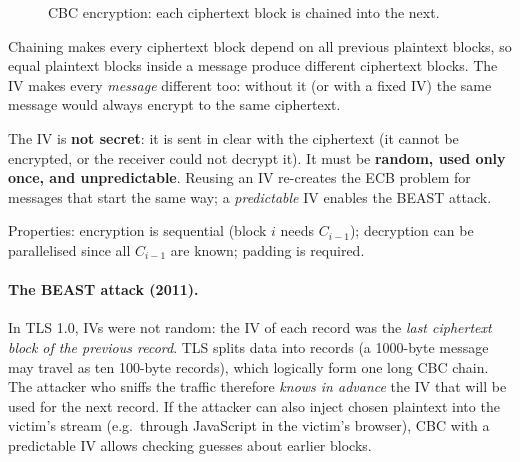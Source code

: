 \begin{figure}[H]
\centering
{}
\caption{CBC encryption: each ciphertext block is chained into the next.}
\label{fig:cbc}
\end{figure}

Chaining makes every ciphertext block depend on all previous plaintext blocks, so equal plaintext blocks inside a message produce different ciphertext blocks. The IV makes every \emph{message} different too: without it (or with a fixed IV) the same message would always encrypt to the same ciphertext.

\begin{remark}
The IV is \textbf{not secret}: it is sent in clear with the ciphertext (it cannot be encrypted, or the receiver could not decrypt it). It must be \textbf{random, used only once, and unpredictable}. Reusing an IV re-creates the ECB problem for messages that start the same way; a \emph{predictable} IV enables the BEAST attack.
\end{remark}

Properties: encryption is sequential (block $i$ needs $C_{i-1}$); decryption can be parallelised since all $C_{i-1}$ are known; padding is required.

\paragraph{The BEAST attack (2011).} In TLS 1.0, IVs were not random: the IV of each record was the \emph{last ciphertext block of the previous record}. TLS splits data into records (a 1000-byte message may travel as ten 100-byte records), which logically form one long CBC chain. The attacker who sniffs the traffic therefore \emph{knows in advance} the IV that will be used for the next record. If the attacker can also inject chosen plaintext into the victim's stream (e.g.\ through JavaScript in the victim's browser), CBC with a predictable IV allows checking guesses about earlier blocks.

